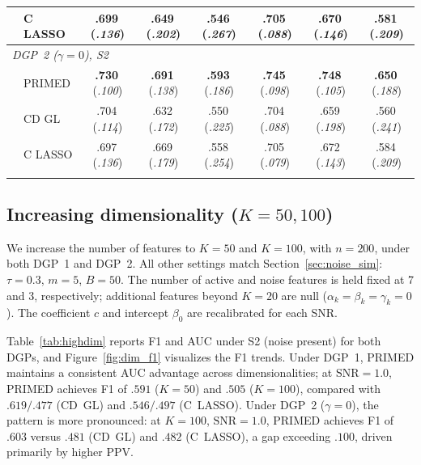 \documentclass[referee,lineno,pdflatex,sn-vancouver-num]{sn-jnl}
\begin{document}
\begin{table}[h]
\begin{tabular*}{\textwidth}{@{\extracolsep\fill}ll ccc ccc}
& C LASSO  & .699\,(\textit{.136}) & .649\,(\textit{.202}) & .546\,(\textit{.267}) & .705\,(\textit{.088}) & .670\,(\textit{.146}) & .581\,(\textit{.209}) \\
\midrule
\multicolumn{8}{l}{\textit{DGP~2 ($\gamma = 0$), S2}} \\[2pt]
& PRIMED   & \textbf{.730}\,(\textit{.100}) & \textbf{.691}\,(\textit{.138}) & \textbf{.593}\,(\textit{.186}) & \textbf{.745}\,(\textit{.098}) & \textbf{.748}\,(\textit{.105}) & \textbf{.650}\,(\textit{.188}) \\
& CD GL    & .704\,(\textit{.114}) & .632\,(\textit{.172}) & .550\,(\textit{.225}) & .704\,(\textit{.088}) & .659\,(\textit{.198}) & .560\,(\textit{.241}) \\
& C LASSO  & .697\,(\textit{.136}) & .669\,(\textit{.179}) & .558\,(\textit{.254}) & .705\,(\textit{.079}) & .672\,(\textit{.143}) & .584\,(\textit{.209}) \\
\botrule
\end{tabular*}
\end{table}



\subsection{Increasing dimensionality ($K = 50, 100$)}\label{sec:highdim}

We increase the number of features to $K = 50$ and $K = 100$, with $n = 200$, under both DGP~1 and DGP~2.
All other settings match Section~\ref{sec:noise_sim}: $\tau = 0.3$, $m = 5$, $B = 50$.
The number of active and noise features is held fixed at 7 and 3, respectively; additional features beyond $K = 20$ are null ($\alpha_k = \beta_k = \gamma_k = 0$).
The coefficient $c$ and intercept $\beta_0$ are recalibrated for each SNR.

Table~\ref{tab:highdim} reports F1 and AUC under S2 (noise present) for both DGPs, and Figure~\ref{fig:dim_f1} visualizes the F1 trends.
Under DGP~1, PRIMED maintains a consistent AUC advantage across dimensionalities; at $\mathrm{SNR} = 1.0$, PRIMED achieves F1 of $.591$ ($K = 50$) and $.505$ ($K = 100$), compared with $.619/.477$ (CD~GL) and $.546/.497$ (C~LASSO).
Under DGP~2 ($\gamma = 0$), the pattern is more pronounced: at $K = 100$, $\mathrm{SNR} = 1.0$, PRIMED achieves F1 of $.603$ versus $.481$ (CD~GL) and $.482$ (C~LASSO), a gap exceeding $.100$, driven primarily by higher PPV.
\end{document}
